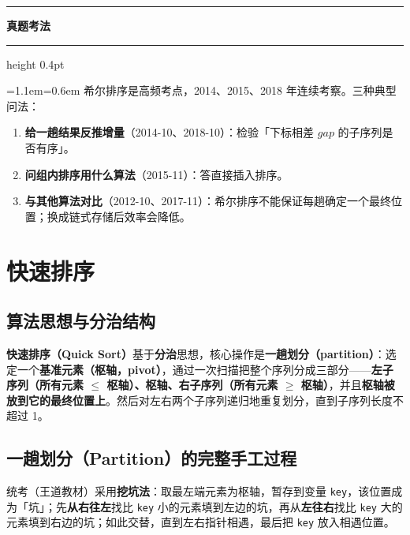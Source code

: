 \documentclass[11pt,openany,UTF8]{ctexbook}
\newcommand{\callouthead}[2]{%
  \par\addvspace{7pt}\noindent
  {\color{#1}\rule[-0.15em]{3pt}{1.05em}}\hspace{0.5em}%
  {\bfseries\color{#1}#2}\par\nobreak\vspace{-0.35em}%
  {\color{rulesep}\hrule height 0.4pt}\nobreak\vspace{0.45em}%
  \begingroup\small\setlength{\parindent}{0pt}%
  \leftskip=1.1em\rightskip=0.6em\noindent\ignorespaces}
\newcommand{\calloutend}{\par\endgroup\addvspace{7pt}}
\newenvironment{callexam}[1]{\callouthead{exambar}{#1}}{\calloutend}
\begin{document}
\begin{callexam}{真题考法}
希尔排序是高频考点，2014、2015、2018 年连续考察。三种典型问法：

\begin{enumerate}
\item \textbf{给一趟结果反推增量}（2014-10、2018-10）：检验「下标相差 $gap$ 的子序列是否有序」。
\item \textbf{问组内排序用什么算法}（2015-11）：答直接插入排序。
\item \textbf{与其他算法对比}（2012-10、2017-11）：希尔排序不能保证每趟确定一个最终位置；换成链式存储后效率会降低。
\end{enumerate}
\end{callexam}

\section{快速排序}

\subsection{算法思想与分治结构}

\textbf{快速排序（Quick Sort）}基于\textbf{分治}思想，核心操作是\textbf{一趟划分（partition）}：选定一个\textbf{基准元素（枢轴，pivot）}，通过一次扫描把整个序列分成三部分——\textbf{左子序列（所有元素 $\le$ 枢轴）、枢轴、右子序列（所有元素 $\ge$ 枢轴）}，并且\textbf{枢轴被放到它的最终位置上}。然后对左右两个子序列递归地重复划分，直到子序列长度不超过 1。

\subsection{一趟划分（Partition）的完整手工过程}

统考（王道教材）采用\textbf{挖坑法}：取最左端元素为枢轴，暂存到变量 \texttt{key}，该位置成为「坑」；先\textbf{从右往左}找比 \texttt{key} 小的元素填到左边的坑，再从\textbf{左往右}找比 \texttt{key} 大的元素填到右边的坑；如此交替，直到左右指针相遇，最后把 \texttt{key} 放入相遇位置。
\end{document}
